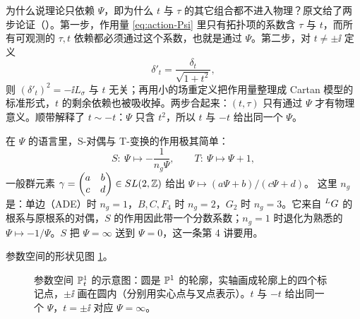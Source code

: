 为什么说理论只依赖 $\Psi$，即为什么 $t$ 与 $\tau$ 的其它组合都不进入物理？原文给了两步论证（）。第一步，作用量 \eqref{eq:action-Psi} 里只有拓扑项的系数含 $\tau$ 与 $t$，而所有可观测的 $\tau,t$ 依赖都必须通过这个系数，也就是通过 $\Psi$。第二步，对 $t\neq\pm\ii$ 定义
\begin{equation}
\delta'_t=\frac{\delta_t}{\sqrt{1+t^2}},
\label{eq:delta-prime}
\end{equation}
则 $(\delta'_t)^2=-\ii L_\sigma$ 与 $t$ 无关；再用小的场重定义把作用量整理成 Cartan 模型的标准形式，$t$ 的剩余依赖也被吸收掉。两步合起来：$(t,\tau)$ 只有通过 $\Psi$ 才有物理意义。顺带解释了 $t\sim-t$：$\Psi$ 只含 $t^2$，所以 $t$ 与 $-t$ 给出同一个 $\Psi$。

在 $\Psi$ 的语言里，S-对偶与 T-变换的作用极其简单：
\begin{equation}
S:\ \Psi\mapsto-\frac{1}{n_g\Psi},\qquad
T:\ \Psi\mapsto \Psi+1,
\label{eq:S-T}
\end{equation}
一般群元素 $\gamma=\begin{pmatrix}a&b\\c&d\end{pmatrix}\in SL(2,\mathbb{Z})$ 给出 $\Psi\mapsto(a\Psi+b)/(c\Psi+d)$。 这里 $n_g$ 是：单边（ADE）时 $n_g=1$，$B,C,F_4$ 时 $n_g=2$，$G_2$ 时 $n_g=3$。它来自 ${}^{L}G$ 的根系与原根系的对偶，$S$ 的作用因此带一个分数系数；$n_g=1$ 时退化为熟悉的 $\Psi\mapsto-1/\Psi$。$S$ 把 $\Psi=\infty$ 送到 $\Psi=0$，这一条第 4 讲要用。

参数空间的形状见图 \ref{fig:cp1}。
\begin{figure}[htbp]
\centering
{}
\caption{参数空间 $\mathbb{P}^1_t$ 的示意图：圆是 $\mathbb{P}^1$ 的轮廓，实轴画成轮廓上的四个标记点，$\pm\ii$ 画在圆内（分别用实心点与叉点表示）。$t$ 与 $-t$ 给出同一个 $\Psi$，$t=\pm\ii$ 对应 $\Psi=\infty$。}
\label{fig:cp1}
\end{figure}

